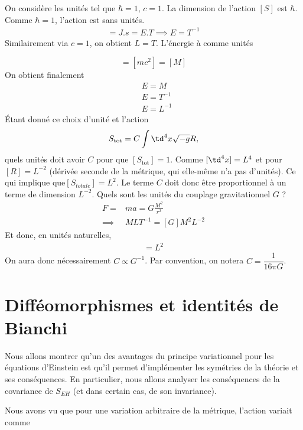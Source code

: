 \begin{rmk}
    On considère les unités tel que $\hbar = 1$, $c = 1$. La dimension de l'action $[S]$ est $\hbar$. Comme $\hbar = 1$, l'action est sans unités. 
    \begin{align}
        [\hbar] =  J.s = E.T \implies E = T^{-1}
\end{align}
Similairement via $c = 1$, on obtient $L = T$. L'énergie à comme unités

\begin{equation}
    [E] = [mc^2] = [M]
\end{equation}
On obtient finalement
\begin{align}
    &E = M\\
    &E = T^{-1}\\
    &E = L^{-1}
\end{align}
Étant donné ce choix d'unité et l'action
\begin{equation}
    S_{\text{tot}} = C \int \td ^4x \sqrt{-g}R,
\end{equation}
quels unités doit avoir $C$ pour que $[S_\text{tot}] = 1$. Comme $[\td^4x] = L^4$ et pour $[R] = L^{-2}$ (dérivée seconde de la métrique, qui elle-même n'a pas d'unités). Ce qui implique que$[S_{totale}] = L^2$. Le terme $C$ doit donc être proportionnel à un terme de dimension $L^{-2}$. Quels sont les unités du couplage gravitationnel $G$ ?
\begin{align}
    F = &ma = G\frac{M^2}{r^2}\\
    \implies &MLT^{-1} = [G]M^{2}L^{-2}
\end{align}
Et donc, en unités naturelles,
\begin{align}
    [G] = L^{2}
\end{align}
On aura donc nécessairement $C \propto G^{-1}$. Par convention, on notera $C = \dfrac{1}{16 \pi G}$.
\end{rmk}
\section{Difféomorphismes et identités de Bianchi}

Nous allons montrer qu'un des avantages du principe variationnel pour les équations d'Einstein est qu'il permet d'implémenter les symétries de la théorie et ses conséquences. En particulier, nous allons analyser les conséquences de la covariance de $S_{EH}$ (et dans certain cas, de son invariance). 

Nous avons vu que pour une variation arbitraire de la métrique, l'action variait comme 

